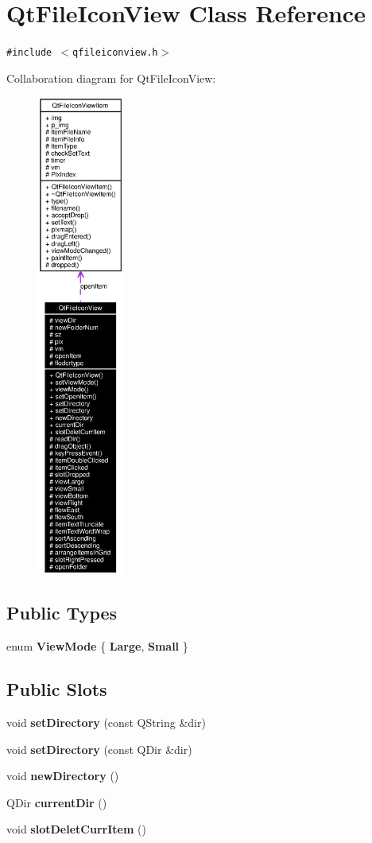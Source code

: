 \section{Qt\-File\-Icon\-View Class Reference}
\label{classQtFileIconView}
{\tt \#include $<$qfileiconview.h$>$}

Collaboration diagram for Qt\-File\-Icon\-View:\begin{figure}[H]
\begin{center}
\leavevmode
\includegraphics[width=80pt]{classQtFileIconView__coll__graph}
\end{center}
\end{figure}
\subsection*{Public Types}
\begin{CompactItemize}
\item 
enum {\bf View\-Mode} \{ {\bf Large}, 
{\bf Small}
 \}
\end{CompactItemize}
\subsection*{Public Slots}
\begin{CompactItemize}
\item 
void {\bf set\-Directory} (const QString \&dir)
\item 
void {\bf set\-Directory} (const QDir \&dir)
\item 
void {\bf new\-Directory} ()
\item 
QDir {\bf current\-Dir} ()
\item 
void {\bf slot\-Delet\-Curr\-Item} ()
\end{CompactItemize}
